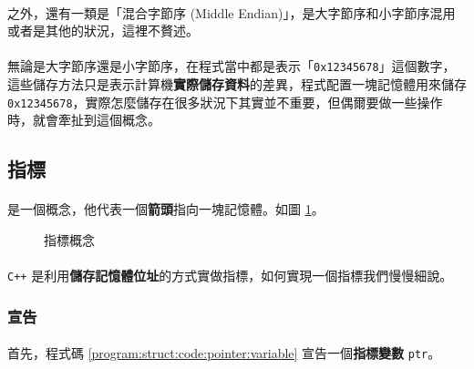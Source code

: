 \documentclass[12pt,a4paper,oneside]{report}
\begin{document}
\begin{CJK}{UTF8}{bkai}
\paragraph{}之外，還有一類是「混合字節序 (Middle Endian)」，是大字節序和小字節序混用或者是其他的狀況，這裡不贅述。
\paragraph{}無論是大字節序還是小字節序，在程式當中都是表示「\texttt{0x12345678}」這個數字，這些儲存方法只是表示計算機\textbf{實際儲存資料}的差異，程式配置一塊記憶體用來儲存 \texttt{0x12345678}，實際怎麼儲存在很多狀況下其實並不重要，但偶爾要做一些操作時，就會牽扯到這個概念。

\subsection{指標}

\paragraph{}是一個概念，他代表一個{\color{blue}\textbf{箭頭}}指向一塊記憶體。如圖 \ref{program:struct:fig:pointer}。

\begin{figure}[h!]
\centering
{}
\caption{指標概念}
\label{program:struct:fig:pointer}
\end{figure}

\paragraph{}\texttt{C++} 是利用{\color{red}\textbf{儲存記憶體位址}}的方式實做指標，如何實現一個指標我們慢慢細說。

\subsubsection{宣告}

\paragraph{}首先，程式碼 \ref{program:struct:code:pointer:variable} 宣告一個\textbf{指標變數} \lstinline!ptr!。


\end{CJK}
\end{document}
